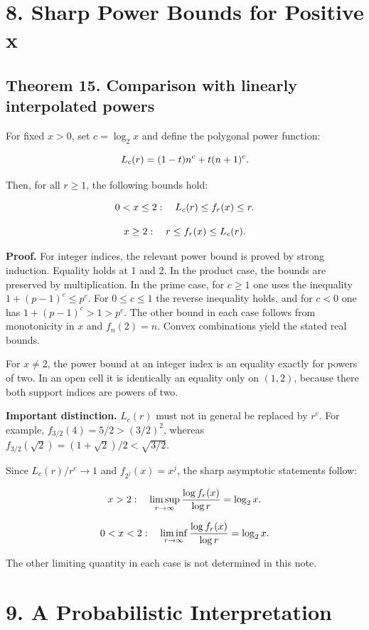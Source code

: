 \documentclass[11pt,a4paper]{article}
\newcommand{\fitmath}[1]{\begingroup\setbox0=\hbox{$\displaystyle #1$}\ifdim\wd0>\linewidth\resizebox{\linewidth}{!}{\box0}\else\box0\fi\endgroup}
\begin{document}
\section*{8. Sharp Power Bounds for Positive x}

\subsection*{Theorem 15. Comparison with linearly interpolated powers}

For fixed $x>0$, set $c=\log_2 x$ and define the polygonal power function:


\[
\fitmath{L_c(r)=(1-t)n^c+t(n+1)^c.}
\]


Then, for all $r\geq1$, the following bounds hold:


\[
\fitmath{0<x\leq2:\quad L_c(r)\leq f_r(x)\leq r.}
\]


\[
\fitmath{x\geq2:\quad r\leq f_r(x)\leq L_c(r).}
\]


\textbf{Proof.} For integer indices, the relevant power bound is proved by strong induction. Equality holds at 1 and 2. In the product case, the bounds are preserved by multiplication. In the prime case, for $c\geq1$ one uses the inequality $1+(p-1)^c\leq p^c$. For $0\leq c\leq1$ the reverse inequality holds, and for $c<0$ one has $1+(p-1)^c>1>p^c$. The other bound in each case follows from monotonicity in $x$ and $f_n(2)=n$. Convex combinations yield the stated real bounds.


For $x\ne2$, the power bound at an integer index is an equality exactly for powers of two. In an open cell it is identically an equality only on $(1,2)$, because there both support indices are powers of two.


\textbf{Important distinction.} $L_c(r)$ must not in general be replaced by $r^c$. For example, $f_{3/2}(4)=5/2>(3/2)^2$, whereas $f_{3/2}(\sqrt2)=(1+\sqrt2)/2<\sqrt{3/2}$.


Since $L_c(r)/r^c\to1$ and $f_{2^j}(x)=x^j$, the sharp asymptotic statements follow:


\[
\fitmath{x>2:\quad \limsup_{r\to\infty}\frac{\log f_r(x)}{\log r}=\log_2 x.}
\]


\[
\fitmath{0<x<2:\quad \liminf_{r\to\infty}\frac{\log f_r(x)}{\log r}=\log_2 x.}
\]


The other limiting quantity in each case is not determined in this note.


\section*{9. A Probabilistic Interpretation}
\end{document}
